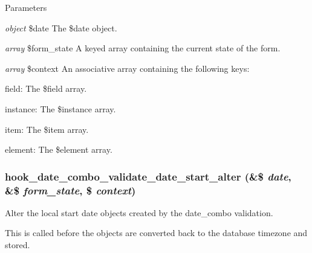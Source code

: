\begin{DoxyParams}{Parameters}
\item[{\em object}]\$date The \$date object. \item[{\em array}]\$form\_\-state A keyed array containing the current state of the form. \item[{\em array}]\$context An associative array containing the following keys:
\begin{DoxyItemize}
\item field: The \$field array.
\item instance: The \$instance array.
\item item: The \$item array.
\item element: The \$element array. 
\end{DoxyItemize}\end{DoxyParams}
\hypertarget{date_8api_8php_a1a8f0f571d13297a9882ec71a9196692}{
\subsubsection[{hook\_\-date\_\-combo\_\-validate\_\-date\_\-start\_\-alter}]{\setlength{\rightskip}{0pt plus 5cm}hook\_\-date\_\-combo\_\-validate\_\-date\_\-start\_\-alter (\&\$ {\em date}, \/  \&\$ {\em form\_\-state}, \/  \$ {\em context})}}
\label{date_8api_8php_a1a8f0f571d13297a9882ec71a9196692}
Alter the local start date objects created by the date\_\-combo validation.

This is called before the objects are converted back to the database timezone and stored.


